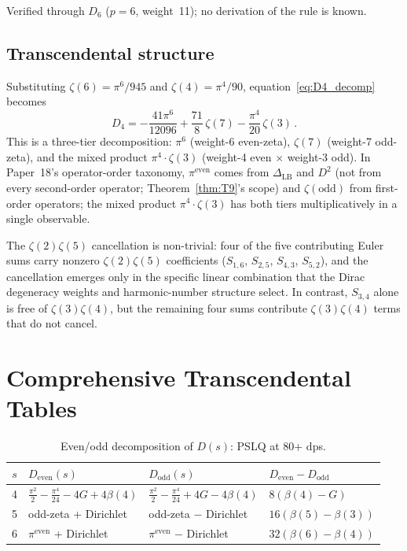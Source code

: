 \documentclass[11pt]{article}
\begin{document}
Verified through $D_6$ ($p = 6$, weight~11); no derivation of the rule
is known.

\subsection{Transcendental structure}

Substituting $\zeta(6) = \pi^6/945$ and $\zeta(4) = \pi^4/90$,
equation~\eqref{eq:D4_decomp} becomes
\begin{equation}
\label{eq:D4_three_tier}
  D_4 = -\frac{41\pi^6}{12096}
  + \frac{71}{8}\,\zeta(7)
  - \frac{\pi^4}{20}\,\zeta(3)\,.
\end{equation}
This is a three-tier decomposition: $\pi^6$ (weight-6 even-zeta),
$\zeta(7)$ (weight-7 odd-zeta), and the mixed product
$\pi^4 \cdot \zeta(3)$ (weight-4 even $\times$ weight-3 odd).
In Paper~18's operator-order taxonomy, $\pi^{\mathrm{even}}$ comes
from $\Delta_{\mathrm{LB}}$ and $D^2$ (not from every second-order
operator; Theorem~\ref{thm:T9}'s scope) and $\zeta(\mathrm{odd})$ from
first-order operators; the mixed product $\pi^4 \cdot \zeta(3)$ has
both tiers multiplicatively in a single observable.

The $\zeta(2)\zeta(5)$ cancellation is non-trivial: four of the five
contributing Euler sums carry nonzero $\zeta(2)\zeta(5)$ coefficients
($S_{1,6}$, $S_{2,5}$, $S_{4,3}$, $S_{5,2}$), and the cancellation
emerges only in the specific linear combination that the Dirac
degeneracy weights and harmonic-number structure select.  In contrast,
$S_{3,4}$ alone is free of $\zeta(3)\zeta(4)$, but the remaining four
sums contribute $\zeta(3)\zeta(4)$ terms that do not cancel.

\section{Comprehensive Transcendental Tables}
\label{sec:tables}

\begin{table}[h]
\centering
\caption{Even/odd decomposition of $D(s)$: PSLQ at 80+ dps.}
\label{tab:D_even_odd}
\begin{tabular}{@{}clll@{}}
\toprule
$s$ & $D_{\mathrm{even}}(s)$ & $D_{\mathrm{odd}}(s)$ & $D_{\mathrm{even}} - D_{\mathrm{odd}}$ \\
\midrule
4 & $\frac{\pi^2}{2} - \frac{\pi^4}{24} - 4G + 4\beta(4)$
  & $\frac{\pi^2}{2} - \frac{\pi^4}{24} + 4G - 4\beta(4)$
  & $8(\beta(4) - G)$ \\[4pt]
5 & odd-zeta + Dirichlet
  & odd-zeta $-$ Dirichlet
  & $16(\beta(5) - \beta(3))$ \\[4pt]
6 & $\pi^{\mathrm{even}}$ + Dirichlet
  & $\pi^{\mathrm{even}}$ $-$ Dirichlet
  & $32(\beta(6) - \beta(4))$ \\
\bottomrule
\end{tabular}
\end{table}
\end{document}
